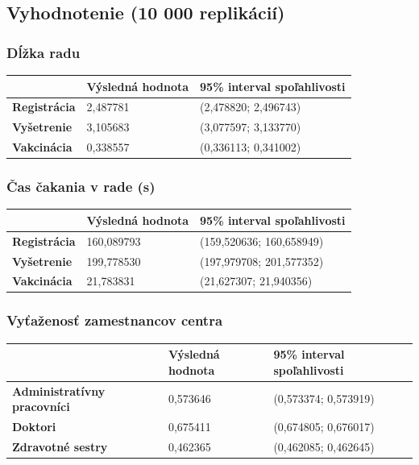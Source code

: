 \documentclass[letterpaper]{article}
\begin{document}
	\subsection*{Vyhodnotenie (10 000 replikácií)}
	
	\subsubsection*{Dĺžka radu}
	
	\begin{table}[hbt!]
		\begin{tabular}{p{6cm}|p{4.5cm}p{4.5cm}}
			& \textbf{Výsledná hodnota} & \textbf{95\% interval spoľahlivosti} \\
			\hline\hline
			\textbf{Registrácia} 	& 2,487781            & (2,478820; 2,496743)			
			\\\hline
			\textbf{Vyšetrenie}  	& 3,105683            & (3,077597; 3,133770)	
			\\\hline
			\textbf{Vakcinácia}  	& 0,338557            & (0,336113; 0,341002)
		\end{tabular}
	\end{table}

	\newpage
	
	\subsubsection*{Čas čakania v rade (s)}
	
	\begin{table}[hbt!]
		\begin{tabular}{p{6cm}|p{4.5cm}p{4.5cm}}
			& \textbf{Výsledná hodnota} & \textbf{95\% interval spoľahlivosti} \\
			\hline\hline
			\textbf{Registrácia} 	& 160,089793          & (159,520636; 160,658949)			
			\\\hline
			\textbf{Vyšetrenie}  	& 199,778530          & (197,979708; 201,577352)	
			\\\hline
			\textbf{Vakcinácia}  	& 21,783831           & (21,627307; 21,940356)
		\end{tabular}
	\end{table}
	
	\subsubsection*{Vyťaženosť zamestnancov centra}
	
	\begin{table}[hbt!]
		\begin{tabular}{p{6cm}|p{4.5cm}p{4.5cm}}
			& \textbf{Výsledná hodnota} & \textbf{95\% interval spoľahlivosti} \\
			\hline\hline
			\textbf{Administratívny pracovníci} 	& 0,573646            & (0,573374; 0,573919)			
			\\\hline
			\textbf{Doktori}  						& 0,675411            & (0,674805; 0,676017)	
			\\\hline
			\textbf{Zdravotné sestry}  				& 0,462365            & (0,462085; 0,462645)
		\end{tabular}
	\end{table}
	
\end{document}
